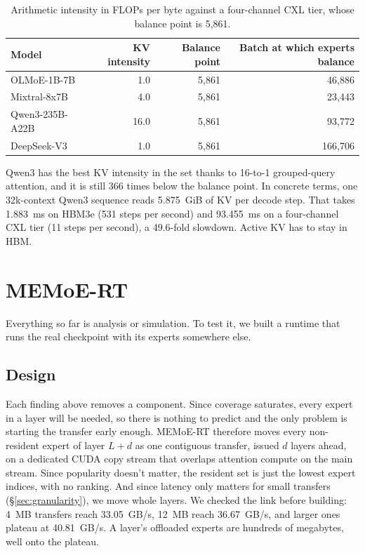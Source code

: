 \documentclass[10pt,a4paper]{article}
\begin{document}
\begin{table}[htbp]
\centering\small
\caption{Arithmetic intensity in FLOPs per byte against a four-channel CXL tier,
whose balance point is 5{,}861.}
\label{tab:kv}
\begin{tabular}{lrrr}
\toprule
Model & KV intensity & Balance point & Batch at which experts balance \\
\midrule
OLMoE-1B-7B     & 1.0  & 5{,}861 & 46{,}886 \\
Mixtral-8x7B    & 4.0  & 5{,}861 & 23{,}443 \\
Qwen3-235B-A22B & 16.0 & 5{,}861 & 93{,}772 \\
DeepSeek-V3     & 1.0  & 5{,}861 & 166{,}706 \\
\bottomrule
\end{tabular}
\end{table}

Qwen3 has the best KV intensity in the set thanks to 16-to-1 grouped-query
attention, and it is still 366 times below the balance point. In concrete terms,
one 32k-context Qwen3 sequence reads 5.875~GiB of KV per decode step. That takes
1.883~ms on HBM3e (531 steps per second) and 93.455~ms on a four-channel CXL tier
(11 steps per second), a 49.6-fold slowdown. Active KV has to stay in HBM.

\section{MEMoE-RT}
\label{sec:system}

Everything so far is analysis or simulation. To test it, we built a runtime that
runs the real checkpoint with its experts somewhere else.

\subsection{Design}

Each finding above removes a component. Since coverage saturates, every expert in
a layer will be needed, so there is nothing to predict and the only problem is
starting the transfer early enough. MEMoE-RT therefore moves every non-resident
expert of layer $L{+}d$ as one contiguous transfer, issued $d$ layers ahead, on a
dedicated CUDA copy stream that overlaps attention compute on the main stream.
Since popularity doesn't matter, the resident set is just the lowest expert
indices, with no ranking. And since latency only matters for small transfers
(\S\ref{sec:granularity}), we move whole layers. We checked the link before
building: 4~MB transfers reach 33.05~GB/s, 12~MB reach 36.67~GB/s, and larger ones
plateau at 40.81~GB/s. A layer's offloaded experts are hundreds of megabytes, well
onto the plateau.
\end{document}
